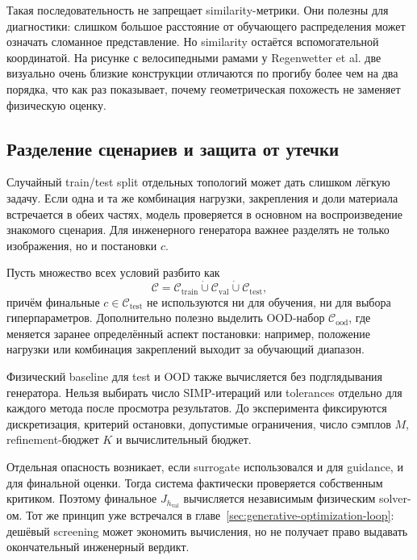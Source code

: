 Такая последовательность не запрещает similarity-метрики. Они полезны для диагностики: слишком большое расстояние от обучающего распределения может означать сломанное представление. Но similarity остаётся вспомогательной координатой. На рисунке с велосипедными рамами у Regenwetter et al. две визуально очень близкие конструкции отличаются по прогибу более чем на два порядка, что как раз показывает, почему геометрическая похожесть не заменяет физическую оценку.

\subsection{Разделение сценариев и защита от утечки}

Случайный train/test split отдельных топологий может дать слишком лёгкую задачу. Если одна и та же комбинация нагрузки, закрепления и доли материала встречается в обеих частях, модель проверяется в основном на воспроизведение знакомого сценария. Для инженерного генератора важнее разделять не только изображения, но и постановки $c$.

Пусть множество всех условий разбито как
\begin{equation}
 \mathcal C
 =
 \mathcal C_{\mathrm{train}}
 \mathbin{\dot\cup}
 \mathcal C_{\mathrm{val}}
 \mathbin{\dot\cup}
 \mathcal C_{\mathrm{test}},
\end{equation}
причём финальные $c\in\mathcal C_{\mathrm{test}}$ не используются ни для обучения, ни для выбора гиперпараметров. Дополнительно полезно выделить OOD-набор $\mathcal C_{\mathrm{ood}}$, где меняется заранее определённый аспект постановки: например, положение нагрузки или комбинация закреплений выходит за обучающий диапазон.

Физический baseline для test и OOD также вычисляется без подглядывания генератора. Нельзя выбирать число SIMP-итераций или tolerances отдельно для каждого метода после просмотра результатов. До эксперимента фиксируются дискретизация, критерий остановки, допустимые ограничения, число сэмплов $M$, refinement-бюджет $K$ и вычислительный бюджет.

Отдельная опасность возникает, если surrogate использовался и для guidance, и для финальной оценки. Тогда система фактически проверяется собственным критиком. Поэтому финальное $J_{h_{\mathrm{val}}}$ вычисляется независимым физическим solver-ом. Тот же принцип уже встречался в главе~\ref{sec:generative-optimization-loop}: дешёвый screening может экономить вычисления, но не получает право выдавать окончательный инженерный вердикт.

